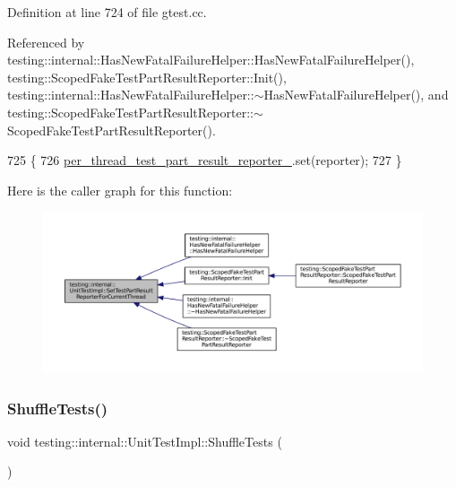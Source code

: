 Definition at line 724 of file gtest.\+cc.



Referenced by testing\+::internal\+::\+Has\+New\+Fatal\+Failure\+Helper\+::\+Has\+New\+Fatal\+Failure\+Helper(), testing\+::\+Scoped\+Fake\+Test\+Part\+Result\+Reporter\+::\+Init(), testing\+::internal\+::\+Has\+New\+Fatal\+Failure\+Helper\+::$\sim$\+Has\+New\+Fatal\+Failure\+Helper(), and testing\+::\+Scoped\+Fake\+Test\+Part\+Result\+Reporter\+::$\sim$\+Scoped\+Fake\+Test\+Part\+Result\+Reporter().


\begin{DoxyCode}
725                                                \{
726   \hyperlink{classtesting_1_1internal_1_1UnitTestImpl_a23ebe35dfe19dcda8e7b17e81f2cb4bc}{per\_thread\_test\_part\_result\_reporter\_}.set(reporter);
727 \}
\end{DoxyCode}
Here is the caller graph for this function\+:
\nopagebreak
\begin{figure}[H]
\begin{center}
\leavevmode
\includegraphics[width=350pt]{classtesting_1_1internal_1_1UnitTestImpl_a1403fc10aebcc64479c5ee980c9b4eb4_icgraph}
\end{center}
\end{figure}
\mbox{\label{classtesting_1_1internal_1_1UnitTestImpl_aaaa38e6a4372e6bb9bbe3143a3a32b65}} 
\subsubsection{\texorpdfstring{Shuffle\+Tests()}{ShuffleTests()}}
{\footnotesize\ttfamily void testing\+::internal\+::\+Unit\+Test\+Impl\+::\+Shuffle\+Tests (\begin{DoxyParamCaption}{ }\end{DoxyParamCaption})}




